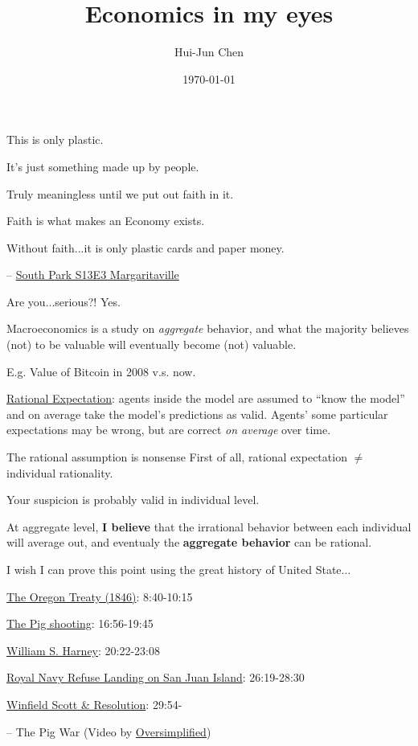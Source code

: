 \documentclass{beamer}
\title{Economics in my eyes}
\author{Hui-Jun Chen}
\institute{The Ohio State University}
\date{\today}
\begin{document}
\maketitle

\begin{frame}[standout]
    This is only plastic.

    It's just something made up by people.

    Truly meaningless until we put out faith in it.

    Faith is what makes an Economy exists.

    Without faith...it is only plastic cards and paper money.

    -- \href{https://youtu.be/YWva4HqVVw0}{South Park S13E3 Margaritaville}
\end{frame}

\begin{frame}{Are you...serious?!}
\label{slide:Are_you___serious__}
    Yes.

    Macroeconomics is a study on \textit{aggregate} behavior, and what the majority believes (not) to be valuable will eventually become (not) valuable.

    E.g. Value of Bitcoin in 2008 v.s. now.

    \href{https://en.wikipedia.org/wiki/Rational_expectations}{Rational Expectation}: agents inside the model are assumed to ``know the model'' and on average take the model's predictions as valid.
    Agents' some particular expectations may be wrong, but are correct \textit{on average} over time.
\end{frame}

\begin{frame}{The rational assumption is nonsense}
\label{slide:The_rational_assumption_is_nonsense}
    First of all, rational expectation $ \neq $ individual rationality.

    Your suspicion is probably valid in individual level.

    At aggregate level, \textbf{I believe} that the irrational behavior between each individual will average out, and eventualy the \textbf{aggregate behavior} can be rational.

    I wish I can prove this point using the great history of United State...
\end{frame}

\begin{frame}[standout]

    \href{https://youtu.be/QLq6GEiHqR8?t=520}{The Oregon Treaty (1846)}: 8:40-10:15

    \href{https://youtu.be/QLq6GEiHqR8?t=1016}{The Pig shooting}: 16:56-19:45

    \href{https://youtu.be/QLq6GEiHqR8?t=1213}{William S. Harney}: 20:22-23:08

    \href{https://youtu.be/QLq6GEiHqR8?t=1579}{Royal Navy Refuse Landing on San Juan Island}: 26:19-28:30

    \href{https://youtu.be/QLq6GEiHqR8?t=1794}{Winfield Scott \& Resolution}: 29:54-

    -- The Pig War (Video by \href{https://youtu.be/QLq6GEiHqR8}{Oversimplified})

\end{frame}
\end{document}
